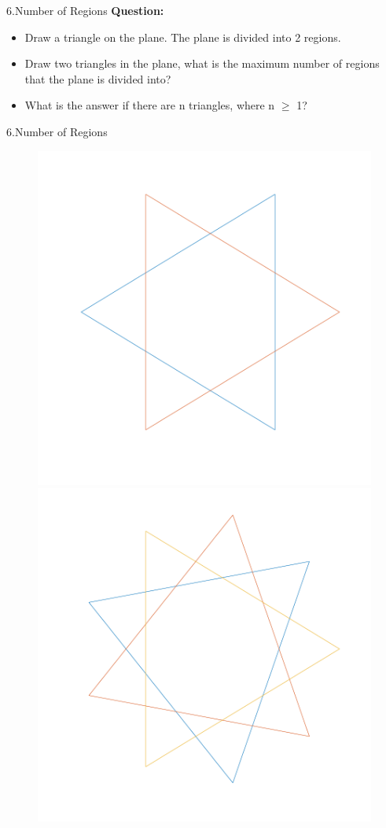 \documentclass{beamer}
\begin{document}
\begin{frame}{6.Number of Regions}
\textbf{Question:}
\begin{itemize}
	\item Draw a triangle on the plane. The plane is divided into 2 regions.
	\item Draw two triangles in the plane, what is the maximum number of regions that the plane is divided into?
	
	\item What is the answer if there are n triangles, where n  $ \geq $ 1?  
\end{itemize}
\end{frame}
\begin{frame}{6.Number of Regions}
\begin{figure}
		\includegraphics[width=0.49\textheight]{2.pdf}
\includegraphics[width=0.49\textheight]{3.pdf}

\end{figure}
\end{frame}
\end{document}
